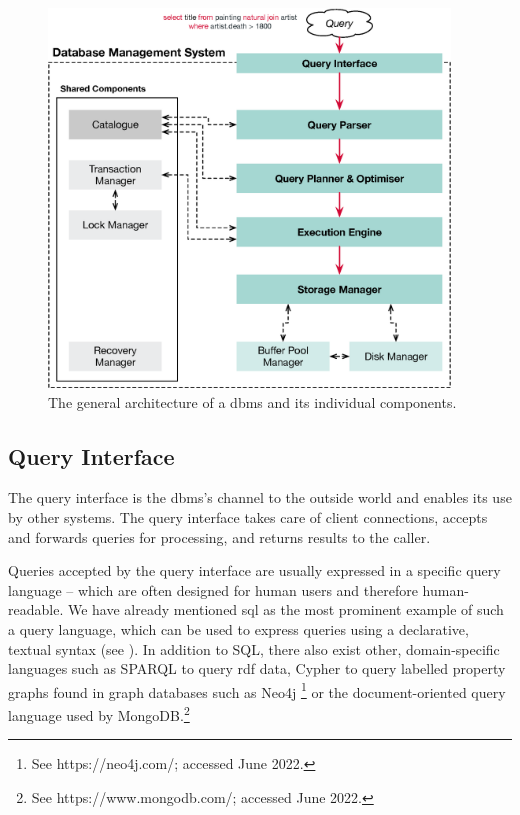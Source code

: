 \begin{figure}[tb]
    \centering
    \includegraphics[width=0.95\textwidth]{figures/dbms-architecture.eps}
    \caption{The general architecture of a \acrshort{dbms} and its individual components.}
    \label{figure:dbms-architecture}
\end{figure}

\subsection{Query Interface}

The query interface is the \acrshort{dbms}'s channel to the outside world and enables its use by other systems. The query interface takes care of client connections, accepts and forwards queries for processing, and returns results to the caller.

Queries accepted by the query interface are usually expressed in a specific query language -- which are often designed for human users and therefore human-readable. We have already mentioned \acrshort{sql} \cite{XOpen:1996SQL,Chamberlin:2012Early} as the most prominent example of such a query language, which can be used to express queries using a declarative, textual syntax (see ). In addition to SQL, there also exist other, domain-specific languages such as SPARQL \cite{Perez:2009Semantics} to query \acrfull{rdf} data, Cypher to query labelled property graphs \cite{Francis:2018Cypher} found in graph databases such as Neo4j \footnote{See https://neo4j.com/; accessed June 2022.} or the document-oriented query language used by MongoDB.\footnote{See https://www.mongodb.com/; accessed June 2022.}

